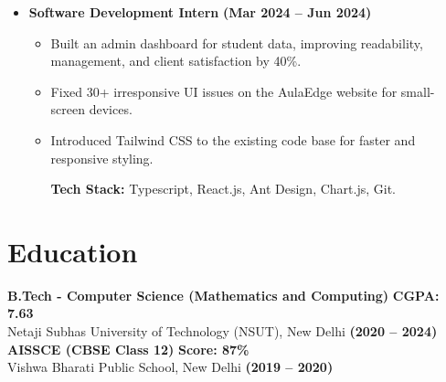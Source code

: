 \documentclass[9.5pt,a4paper]{article}
\begin{document}
\vspace*{-1em}
\begin{itemize}[left=0.4cm, itemsep=0pt, topsep=0pt, partopsep=0pt]
    \item \textbf{Software Development Intern} \hfill \textbf{(Mar 2024 -- Jun 2024)}
    \begin{itemize}[left=0cm, itemsep=0pt, topsep=-1pt, partopsep=0pt]
      \setlength{\rightskip}{0.05\textwidth}
      \item Built an admin dashboard for student data, improving readability, management, and client satisfaction by 40\%.
      \item Fixed 30+ irresponsive UI issues on the AulaEdge website for small-screen devices.
      \item Introduced Tailwind CSS to the existing code base for faster and responsive styling.
      \begin{adjustwidth}{-1.2em}{0pt}
        \textbf{Tech Stack:} Typescript, React.js, Ant Design, Chart.js, Git.
      \end{adjustwidth}
    \end{itemize}
\end{itemize}

\section*{Education}
\textbf{B.Tech - Computer Science (Mathematics and Computing)} \hfill \textbf{CGPA: 7.63} \\
Netaji Subhas University of Technology (NSUT), New Delhi \hfill \textbf{(2020 -- 2024)} \\ [0.4 em]
\textbf{AISSCE (CBSE Class 12)} \hfill \textbf{Score: 87\%} \\
Vishwa Bharati Public School, New Delhi \hfill \textbf{(2019 -- 2020)}
\end{document}
